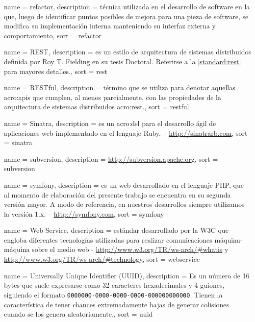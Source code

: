  {
  name = {refactor},
  description = {técnica utilizada en el desarrollo de software en la que, luego de identificar puntos posibles de mejora para una pieza de software, se modifica su implementación interna manteniendo su interfaz externa y comportamiento},
  sort = {refactor}
}

 {
  name = {REST},
  description = {es un estilo de arquitectura de sistemas distribuidos definida por Roy T. Fielding en su tesis Doctoral. Referirse a la \autoref{standard:rest} para mayores detalles.},
  sort = {rest}
}

 {
  name = {RESTful},
  description = {término que se utiliza para denotar aquellas \glspl{acro:api} que cumplen, al menos parcialmente, con las propiedades de la arquitectura de sistemas distribuidos \gls{acro:rest}.},
  sort = {restful}
}

 {
  name = {Sinatra},
  description = {es un \gls{acro:dsl} para el desarrollo ágil de aplicaciones web implementado en el lenguaje Ruby. – \url{http://sinatrarb.com}},
  sort = {sinatra}
}

 {
  name = {subversion},
  description = {\url{http://subversion.apache.org}},
  sort = {subversion}
}

 {
  name = {symfony},
  description = {es un  web desarrollado en el lenguaje PHP, que al momento de elaboración del presente trabajo se encuentra en su segunda versión mayor. A modo de referencia, en nuestros desarrollos siempre utilizamos la versión 1.x. – \url{http://symfony.com}},
  sort = {symfony}
}

 {
  name = {Web Service},
  description = {estándar desarrollado por la W3C que engloba diferentes tecnologías utilizadas para realizar comunicaciones máquina-máquina sobre el medio web - \url{http://www.w3.org/TR/ws-arch/\#whatis} y \url{http://www.w3.org/TR/ws-arch/\#technology}},
  sort = {webservice}
}

 {
  name = {Universally Unique Identifier (UUID)},
  description = {Es un número de 16 bytes que suele expresarse como 32 caracteres hexadecimales y 4 guiones, siguiendo el formato \texttt{0000000-0000-0000-0000-000000000000}. Tienen la característica de tener chances extremadamente bajas de generar colisiones cuando se los genera aleatoriamente.},
  sort = {uuid}
}

